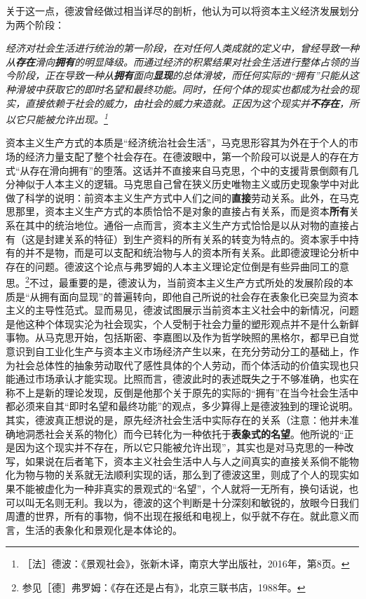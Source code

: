 \documentclass[fontset=fandol, a4paper, 12pt, openright]{ctexbook}
\renewenvironment{quote}
  {\list{}{\rightmargin\leftmargin}%
   \item\relax\small\itshape\color{darkgray}}
  {\endlist}
\begin{document}
关于这一点，德波曾经做过相当详尽的剖析，他认为可以将资本主义经济发展划分为两个阶段：

\begin{quote}
经济对社会生活进行统治的第一阶段，在对任何人类成就的定义中，曾经导致一种从\textbf{存在}滑向\textbf{拥有}的明显降级。而通过经济的积累结果对社会生活进行整体占领的当今阶段，正在导致一种从\textbf{拥有}面向\textbf{显现}的总体滑坡，而任何实际的“拥有”只能从这种滑坡中获取它的即时名望和最终功能。同时，任何个体的现实也都成为社会的现实，直接依赖于社会的威力，由社会的威力来造就。正因为这个现实并\textbf{不存在}，所以它只能被允许出现。\footnote{［法］德波：《景观社会》，张新木译，南京大学出版社，2016年，第8页。}
\end{quote}

资本主义生产方式的本质是“经济统治社会生活”，马克思形容其为外在于个人的市场的经济力量支配了整个社会存在。在德波眼中，第一个阶段可以说是人的存在方式“从存在滑向拥有”的堕落。这话并不直接来自马克思，个中的支援背景倒颇有几分神似于人本主义的逻辑。{\kaishu 马克思自己曾在狭义历史唯物主义或历史现象学中对此做了科学的说明：前资本主义生产方式中人们之间的\textbf{直接}劳动关系。}此外，在马克思那里，资本主义生产方式的本质恰恰不是对象的直接占有关系，而是资本\textbf{所有}关系在其中的统治地位。通俗一点而言，资本主义生产方式恰恰是以从对物的直接占有（这是封建关系的特征）到生产资料的所有关系的转变为特点的。资本家手中持有的并不是物，而是可以支配和统治物与人的资本所有关系。此即德波理论分析中存在的问题。{\kaishu 德波这个论点与弗罗姆的人本主义理论定位倒是有些异曲同工的意思。\footnote{参见［德］弗罗姆：《存在还是占有》，北京三联书店，1988年。}}不过，最重要的是，德波认为，当前资本主义生产方式所处的发展阶段的本质是“从拥有面向显现”的普遍转向，即他自己所说的社会存在表象化已突显为资本主义的主导性范式。显而易见，德波试图展示当前资本主义社会中的新情况，问题是他这种个体现实沦为社会现实，个人受制于社会力量的塑形观点并不是什么新鲜事物。从马克思开始，包括斯密、李嘉图以及作为哲学映照的黑格尔，都早已自觉意识到自工业化生产与资本主义市场经济产生以来，在充分劳动分工的基础上，作为社会总体性的抽象劳动取代了感性具体的个人劳动，而个体活动的价值实现也只能通过市场承认才能实现。比照而言，德波此时的表述既失之于不够准确，也实在称不上是新的理论发现，反倒是他那个关于原先的实际的“拥有”在当今社会生活中都必须来自其“即时名望和最终功能”的观点，多少算得上是德波独到的理论说明。其实，德波真正想说的是，原先经济社会生活中实际存在的关系（注意：他并未准确地洞悉社会关系的物化）而今已转化为一种依托于\textbf{表象式的名望}。他所说的“正是因为这个现实并不存在，所以它只能被允许出现”，其实也是对马克思的一种改写，如果说在后者笔下，资本主义社会生活中人与人之间真实的直接关系倘不能物化为物与物的关系就无法顺利实现的话，那么到了德波这里，则成了个人的现实如果不能被虚化为一种非真实的景观式的“名望”，个人就将一无所有，换句话说，也可以叫无名则无利。我以为，德波的这个判断是十分深刻和敏锐的，放眼今日我们周遭的世界，所有的事物，倘不出现在报纸和电视上，似乎就不存在。就此意义而言，生活的表象化和景观化是本体论的。
\end{document}
